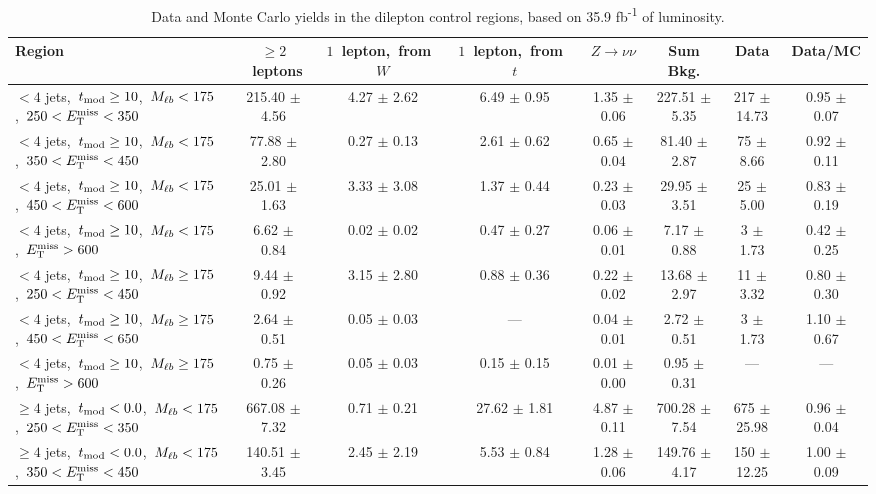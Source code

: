 \begin{table}
\centering
{\scriptsize
\caption{Data and Monte Carlo yields in the dilepton control regions,
  based on 35.9 fb\textsuperscript{-1} of luminosity.}
\label{tab:stop:lostlep:cryields}
\begin{tabular}{|l|c c c c c|c|c|}
\hline
Region  & $\ge2$~leptons & $1$~lepton,~from~$W$ & $1$~lepton,~from~$t$ & $Z\rightarrow\nu\nu$ & Sum Bkg. & Data & Data/MC \\*
\hline \hline
$<4$ jets,~$t_\text{mod} \ge10$,~$M_{\ell b}<175$,~$250<E_\text{T}^\text{miss}<350$  & 215.40 $\pm$ 4.56  & 4.27 $\pm$ 2.62  & 6.49 $\pm$ 0.95  & 1.35 $\pm$ 0.06  & 227.51 $\pm$ 5.35  & 217 $\pm$ 14.73  & 0.95 $\pm$ 0.07 \\*
$<4$ jets,~$t_\text{mod} \ge10$,~$M_{\ell b}<175$,~$350<E_\text{T}^\text{miss}<450$  & 77.88 $\pm$ 2.80  & 0.27 $\pm$ 0.13  & 2.61 $\pm$ 0.62  & 0.65 $\pm$ 0.04  & 81.40 $\pm$ 2.87  & 75 $\pm$ 8.66  & 0.92 $\pm$ 0.11 \\*
$<4$ jets,~$t_\text{mod} \ge10$,~$M_{\ell b}<175$,~$450<E_\text{T}^\text{miss}<600$  & 25.01 $\pm$ 1.63  & 3.33 $\pm$ 3.08  & 1.37 $\pm$ 0.44  & 0.23 $\pm$ 0.03  & 29.95 $\pm$ 3.51  & 25 $\pm$ 5.00  & 0.83 $\pm$ 0.19 \\*
$<4$ jets,~$t_\text{mod} \ge10$,~$M_{\ell b}<175$,~$E_\text{T}^\text{miss}>600$  & 6.62 $\pm$ 0.84  & 0.02 $\pm$ 0.02  & 0.47 $\pm$ 0.27  & 0.06 $\pm$ 0.01  & 7.17 $\pm$ 0.88  & 3 $\pm$ 1.73  & 0.42 $\pm$ 0.25 \\*
\hline
$<4$ jets,~$t_\text{mod} \ge10$,~$M_{\ell b}\ge175$,~$250<E_\text{T}^\text{miss}<450$  & 9.44 $\pm$ 0.92  & 3.15 $\pm$ 2.80  & 0.88 $\pm$ 0.36  & 0.22 $\pm$ 0.02  & 13.68 $\pm$ 2.97  & 11 $\pm$ 3.32  & 0.80 $\pm$ 0.30 \\*
$<4$ jets,~$t_\text{mod} \ge10$,~$M_{\ell b}\ge175$,~$450<E_\text{T}^\text{miss}<650$  & 2.64 $\pm$ 0.51  & 0.05 $\pm$ 0.03  & ---  & 0.04 $\pm$ 0.01  & 2.72 $\pm$ 0.51  & 3 $\pm$ 1.73  & 1.10 $\pm$ 0.67 \\*
$<4$ jets,~$t_\text{mod} \ge10$,~$M_{\ell b}\ge175$,~$E_\text{T}^\text{miss}>600$  & 0.75 $\pm$ 0.26  & 0.05 $\pm$ 0.03  & 0.15 $\pm$ 0.15  & 0.01 $\pm$ 0.00  & 0.95 $\pm$ 0.31  & --- & --- \\*
\hline
$\ge4$ jets,~$t_\text{mod} <0.0$,~$M_{\ell b}<175$,~$250<E_\text{T}^\text{miss}<350$  & 667.08 $\pm$ 7.32  & 0.71 $\pm$ 0.21  & 27.62 $\pm$ 1.81  & 4.87 $\pm$ 0.11  & 700.28 $\pm$ 7.54  & 675 $\pm$ 25.98  & 0.96 $\pm$ 0.04 \\*
$\ge4$ jets,~$t_\text{mod} <0.0$,~$M_{\ell b}<175$,~$350<E_\text{T}^\text{miss}<450$  & 140.51 $\pm$ 3.45  & 2.45 $\pm$ 2.19  & 5.53 $\pm$ 0.84  & 1.28 $\pm$ 0.06  & 149.76 $\pm$ 4.17  & 150 $\pm$ 12.25  & 1.00 $\pm$ 0.09 \\*

\end{tabular}}
\end{table}
